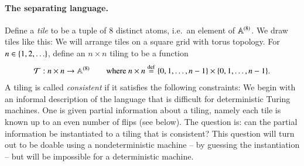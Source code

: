 




\newcommand{\pairtiles}{$\atoms^{\!(2)}$}
\paragraph*{The separating language.} 
Define a \emph{tile} to be a tuple of 8 distinct atoms, i.e.~an element of $\mathbb A^{(8)}$. We draw tiles like this:
We will arrange tiles on a square grid with torus topology. 
For $n \in \{1,2,\ldots\}$, define an $n \times n$ tiling to be a function
\begin{align*}
 {\mathcal T} : n \times n \to \mathbb A^{(8)} \qquad \text{where } n \times n \stackrel {\mathrm{def}} = \{0,1,\ldots,n-1\} \times \{0,1,\ldots,n-1\}.
\end{align*}
A tiling is called \emph{consistent} if it satisfies the following constraints:
We begin with an informal description of the language that is difficult for deterministic Turing machines. One is given partial information about a tiling, namely each tile is known up to an even number of flips (see below). The question is: can the partial information be instantiated to a tiling that is consistent? This question will turn out to be doable using a nondeterministic machine -- by guessing the instantiation -- but will be impossible for a deterministic machine.

